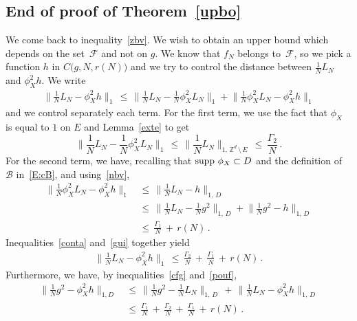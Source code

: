 \documentclass[AHL, Unicode, longabstracts, published]{cedram}
\newcommand*\supp{\text{supp\,}}
\newcommand*\Zd {{\mathbb Z^d}}
\newcommand{\cB}{\mathcal{B}}
\newcommand{\cF}{\mathcal{F}}
\begin{document}
\subsection{End of proof of Theorem~\ref{upbo}}\label{conc}
We come back to inequality~\eqref{zbv}. We wish to obtain an upper bound which depends on the set~$\cF$ and not on $g$. We know that $f_N$ belongs to~$\cF$, so we pick a function $h$ in $C\big(g,N, r(N)\big)$ and we try to control the distance between $\frac{1}{N}L_N$ and $\phi_X^2h$. We write
\begin{align*}
\Big\|\frac{1}{N}L_N-\phi_X^2h\Big\|_{1}
\,\leq\,
\Big\|\frac{1}{N}L_N-
\frac{1}{N}
\phi_X^2 L_N
\Big\|_{1} +
\Big\|\frac{1}{N}
\phi_X^2 L_N-
\phi_X^2 h\Big\|_{1}
\end{align*}
and we control separately each term. For the first term, we use the fact that $\phi_X$ is equal to $1$ on $E$ and Lemma~\ref{exte} to get
\begin{equation}\label{conta}
\Big\|\frac{1}{N}L_N-
\frac{1}{N}
\phi_X^2 L_N
\Big\|_{1}
\,\leq\, \|\frac{1}{N}L_N\|_{1,\,\Zd\,\setminus\,E}
\,\leq\,
\frac{\Gamma_2}{N}\,.
\end{equation}
For the second term, we have, recalling that $\supp\,\phi_X\subset D$ and the definition of $\cB$ in~\eqref{E:cB}, and using~\eqref{nbv},
\begin{equation}\label{gui}
\begin{aligned}
\Big\|\frac{1}{N}
\phi_X^2 L_N-
\phi_X^2 h\Big\|_{1}\,&\leq\,
\Big\|\frac{1}{N}L_N- h\Big\|_{1,\,D}\\
\,&\leq\,
\Big\|\frac{1}{N}L_N- \frac{1}{N}g^2\Big\|_{1,\,D}+
\Big\|\frac{1}{N}g^2- h\Big\|_{1,\,D}\\
\,&\leq\,
\frac{\Gamma_1}{{N}}\,+\,r(N)
\,.
\end{aligned}
\end{equation}
Inequalities~\eqref{conta} and~\eqref{gui} together yield
\begin{align}\label{pouf}
\Big\|\frac{1}{N}L_N-
\phi_X^2 h\Big\|_{1}\,\leq\,
\frac{\Gamma_2}{{N}}\,+\,
\frac{\Gamma_1}{{N}}\,+\, r(N)
\,.
\end{align}
Furthermore, we have, by inequalities~\eqref{cfg} and~\eqref{pouf},
\begin{equation}\label{aie}
\begin{aligned}
\Big\|\frac{1}{N}g^2-
\phi_X^2 h\Big\|_{1,D}&\,\leq\,
\Big\|\frac{1}{N}g^2-\frac{1}{N}L_N\Big\|_{1,\,D}\,+\,
\Big\|\frac{1}{N}L_N-
\phi_X^2 h\Big\|_{1,\,D}\\ &\,\leq\,
\frac{\Gamma_1}{{N}}\,+\,
\frac{\Gamma_2}{{N}}\,+\,
\frac{\Gamma_1}{{N}}\,+\, r(N)\,.
\end{aligned}
\end{equation}
\end{document}
